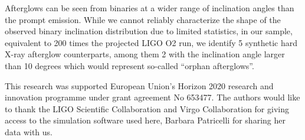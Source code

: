 \documentclass[11pt]{article}
\begin{document}
Afterglows can be seen from binaries at a wider range of inclination
angles than the prompt emission. While we cannot reliably characterize
the shape of the observed binary inclination distribution due to
limited statistics, in our sample, equivalent to 200 times the
projected LIGO O2 run, we identify 5 synthetic hard X-ray afterglow
counterparts, among them 2 with the inclination angle larger than 10
degrees which would represent so-called ``orphan afterglows''.

\vspace{3mm}


{\linespread{0.1} \footnotesize \noindent This research was supported European
  Union's Horizon 2020 research and innovation programme under grant agreement
  No 653477. The authors would like to thank the LIGO Scientific Collaboration
  and Virgo Collaboration for giving access to the simulation software used
  here, Barbara Patricelli for sharing her data with us.}


\vspace*{-5mm}
{\footnotesize
}
\end{document}
